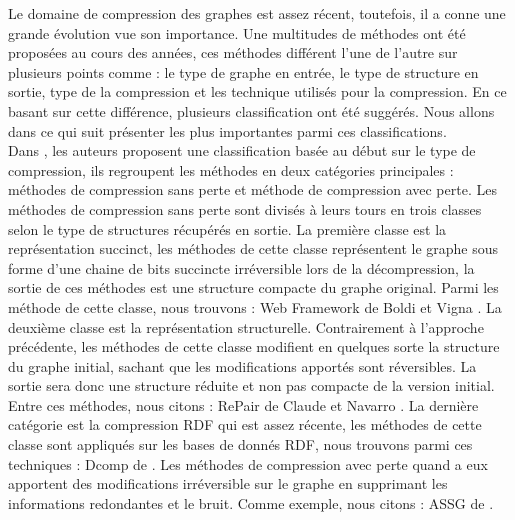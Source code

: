 Le domaine de compression des graphes est assez récent, toutefois, il a conne une grande évolution vue son importance. Une multitudes de méthodes ont été proposées au cours des années, ces méthodes différent l'une de l'autre sur plusieurs points comme : le type de graphe en entrée, le type de structure en sortie, type de la compression et les technique utilisés pour la compression. En ce basant sur cette différence, plusieurs classification ont été suggérés. Nous allons dans ce qui suit présenter les plus importantes parmi ces classifications.\\

Dans \citep{maneth2015survey}, les auteurs proposent une classification basée au début sur le type de compression, ils regroupent les méthodes en deux catégories principales : méthodes de compression sans perte et méthode de compression avec perte. Les méthodes de compression sans perte sont divisés à leurs tours  en trois classes selon le type de structures récupérés en sortie. La première classe est la représentation succinct, les méthodes de cette classe représentent le graphe sous forme d'une chaine de bits succincte irréversible lors de la décompression, la sortie de ces méthodes est une structure compacte du graphe original. Parmi les méthode de cette classe, nous trouvons : Web Framework de Boldi et Vigna \citep{boldi2004webgraph}. La deuxième classe est la représentation structurelle. Contrairement à l'approche précédente, les méthodes de cette classe modifient en quelques sorte la structure du graphe initial, sachant que les modifications apportés sont réversibles. La sortie sera donc une structure réduite et non pas compacte de la version initial. Entre ces méthodes, nous citons : RePair de Claude et Navarro \citep{claude2010fas}. La dernière catégorie est la compression RDF qui est assez récente, les méthodes de cette classe sont appliqués sur les bases de donnés RDF, nous trouvons parmi ces techniques : Dcomp de \citep{martinez2012compression} . Les méthodes de compression avec perte quand a eux apportent des modifications irréversible sur le graphe en supprimant les informations redondantes et le bruit. Comme exemple, nous citons : ASSG de \citep{zhang2014assg}.\\

